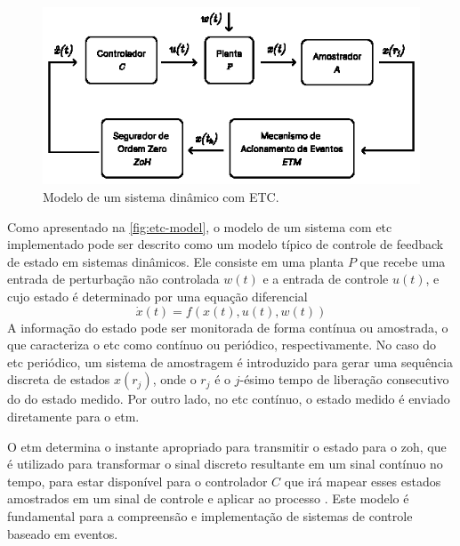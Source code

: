 \begin{figure}[H]
  \centering
  \includegraphics[scale=2.]{figuras/etc-model.eps}
  \caption{Modelo de um sistema dinâmico com ETC.}
  \label{fig:etc-model}
\end{figure}

Como apresentado na \autoref{fig:etc-model}, o modelo de um sistema com \acrshort{etc} implementado pode ser descrito como um modelo típico de controle de feedback de estado em sistemas dinâmicos. Ele consiste em uma planta $P$ que recebe uma entrada de perturbação não controlada $w(t)$ e a entrada de controle $u(t)$, e cujo estado é determinado por uma equação diferencial \begin{equation}\dot{x}(t) = f(x(t), u(t), w(t))\end{equation} A informação do estado pode ser monitorada de forma contínua ou amostrada, o que caracteriza o \acrshort{etc} como contínuo ou periódico, respectivamente. No caso do \acrshort{etc} periódico, um sistema de amostragem é introduzido para gerar uma sequência discreta de estados $x(r_j)$, onde o $r_j$ é  o $j$-ésimo tempo de liberação consecutivo do do estado medido. Por outro lado, no \acrshort{etc} contínuo, o estado medido é enviado diretamente para o \acrshort{etm}. \cite{peng2018,coutinho2021,Lemmon2010}

O \acrshort{etm} determina o instante apropriado para transmitir o estado para o \acrfull{zoh}, que é utilizado para transformar o sinal discreto resultante em um sinal contínuo no tempo,  para estar disponível para o controlador $C$ que irá mapear esses estados amostrados em um sinal de controle e aplicar ao processo \cite{coutinho2021}. Este modelo é fundamental para a compreensão e implementação de sistemas de controle baseado em eventos.

